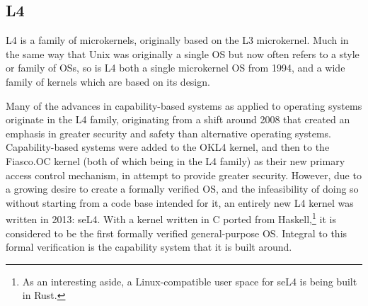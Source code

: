 \subsection{L4}
\label{subsec:L4}
L4 is a family of microkernels, originally based on the L3 microkernel. Much in the same way that Unix was originally a single OS but now often refers to a style or family of OSs, so is L4 both a single microkernel OS from 1994, and a wide family of kernels which are based on its design.~\cite{elphinstone2013}

Many of the advances in capability-based systems as applied to operating systems originate in the L4 family, originating from a shift around 2008 that created an emphasis in greater security and safety than alternative operating systems. Capability-based systems were added to the OKL4 kernel, and then to the Fiasco.OC kernel (both of which being in the L4 family) as their new primary access control mechanism, in attempt to provide greater security. However, due to a growing desire to create a formally verified OS, and the infeasibility of doing so without starting from a code base intended for it, an entirely new L4 kernel was written in 2013: seL4. With a kernel written in C ported from Haskell,\footnote{As an interesting aside, a Linux-compatible user space for seL4 is being built in Rust.} it is considered to be the first formally verified general-purpose OS. Integral to this formal verification is the capability system that it is built around.

